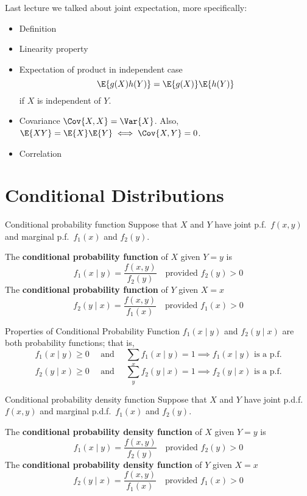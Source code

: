 Last lecture we talked about joint expectation, more specifically:
\begin{itemize}
    \item Definition
    \item Linearity property
    \item Expectation of product in independent case
          \[ \E{g(X)h(Y)}=\E{g(X)}\E{h(Y)} \]
          if $ X $ is independent of $ Y $.
    \item Covariance $ \Cov{X,X}=\Var{X} $. Also,
          $ \E{XY}=\E{X}\E{Y}\iff \Cov{X,Y}=0 $.
    \item Correlation
\end{itemize}
\section{Conditional Distributions}
\begin{Definition}{Conditional probability function}{}
    Suppose that $ X $ and $ Y $ have joint p.f.\ $ f(x,y) $
    and marginal p.f.\ $ f_1(x) $ and $ f_2(y) $.

    The \textbf{conditional probability function}
    of $ X $ given $ Y=y $ is
    \[ f_1(x\mid y)=\frac{f(x,y)}{f_2(y)}\quad\text{provided } f_2(y)>0 \]
    The \textbf{conditional probability function} of $ Y $ given $ X=x $
    \[ f_2(y\mid x)=\frac{f(x,y)}{f_1(x)}\quad\text{provided } f_1(x)>0 \]
\end{Definition}
\begin{Proposition}{Properties of Conditional Probability Function}{}
    $ f_1(x\mid y) $ and $ f_2(y\mid x) $ are both probability functions;
    that is,
    \[ f_1(x\mid y)\geqslant 0 \quad\text{ and }\quad
        \sum_{x}f_1(x\mid y)=1\implies f_1(x\mid y)\text{ is a p.f.}\]
    \[ f_2(y\mid x)\geqslant 0 \quad\text{ and }\quad
        \sum_{y}f_2(y\mid x)=1\implies f_2(y\mid x)\text{ is a p.f.}\]
\end{Proposition}
\begin{Definition}{Conditional probability density function}{}
    Suppose that $ X $ and $ Y $ have joint p.d.f.\ $ f(x,y) $
    and marginal p.d.f.\ $ f_1(x) $ and $ f_2(y) $.

    The \textbf{conditional probability density function}
    of $ X $ given $ Y=y $ is
    \[ f_1(x\mid y)=\frac{f(x,y)}{f_2(y)}\quad\text{provided } f_2(y)>0  \]
    The \textbf{conditional probability density function} of $ Y $ given $ X=x $
    \[ f_2(y\mid x)=\frac{f(x,y)}{f_1(x)}\quad\text{provided } f_1(x)>0 \]
\end{Definition}
